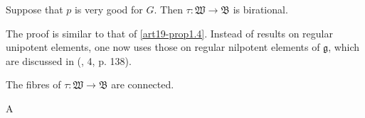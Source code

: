 \begin{proposition}\label{art19-prop2.4}
Suppose that $p$ is very good for $G$. Then $\tau :\mathfrak{W}\to \mathfrak{B}$ is birational.
\end{proposition}

The proof is similar to that of \ref{art19-prop1.4}. Instead of results on regular unipotent elements, one now uses those on regular nilpotent elements of $\mathfrak{g}$, which are discussed in (\cite{art19-key14}, 4, p. 138).

\begin{proposition}\label{art19-prop2.5}
The fibres of $\tau : \mathfrak{W}\to \mathfrak{B}$ are connected.
\end{proposition}

A\pageoriginale %
